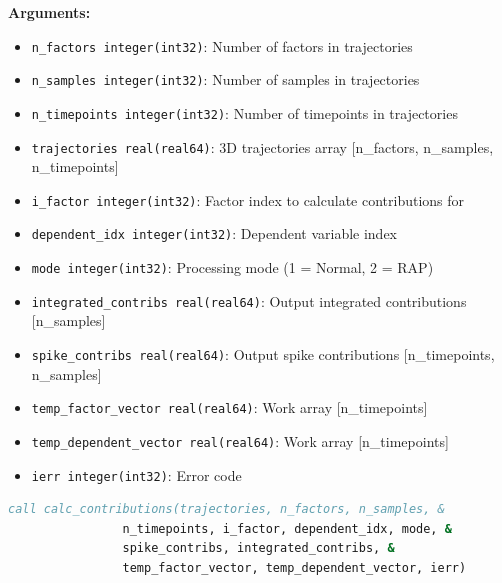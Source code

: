 \documentclass[11pt]{article}
\begin{document}
\begin{enumerate}
\begin{enumerate}
	      	      \textbf{Arguments:}
	      	      \begin{itemize}
	      	      	\item \texttt{n\_factors integer(int32)}: Number of factors in trajectories
	      	      	      
	      	      	\item \texttt{n\_samples integer(int32)}: Number of samples in trajectories
	      	      	      
	      	      	\item \texttt{n\_timepoints integer(int32)}: Number of timepoints in
	      	      	      trajectories
	      	      	      
	      	      	\item \texttt{trajectories real(real64)}: 3D trajectories array [n\_factors,
	      	      	n\_samples, n\_timepoints]
	      	      	
	      	      	\item \texttt{i\_factor integer(int32)}: Factor index to calculate contributions
	      	      	      for
	      	      	      
	      	      	\item \texttt{dependent\_idx integer(int32)}: Dependent variable index
	      	      	      
	      	      	\item \texttt{mode integer(int32)}: Processing mode (1 = Normal, 2 =
	      	      	      RAP)
	      	      	      
	      	      	\item \texttt{integrated\_contribs real(real64)}: Output integrated contributions
	      	      	      [n\_samples]
	      	      	      
	      	      	\item \texttt{spike\_contribs real(real64)}: Output spike contributions
	      	      	      [n\_timepoints, n\_samples]
	      	      	      
	      	      	\item \texttt{temp\_factor\_vector real(real64)}: Work array [n\_timepoints]
	      	      	      
	      	      	\item \texttt{temp\_dependent\_vector real(real64)}: Work array [n\_timepoints]
	      	      	      
	      	      	\item \texttt{ierr integer(int32)}: Error code
	      	      \end{itemize}
	      	      \begin{lstlisting}[language=Fortran, caption={Expert Contributions Calculation}]
call calc_contributions(trajectories, n_factors, n_samples, & 
                n_timepoints, i_factor, dependent_idx, mode, &
                spike_contribs, integrated_contribs, &
                temp_factor_vector, temp_dependent_vector, ierr)
	      	      \end{lstlisting}
	      	      

\end{enumerate}
\end{enumerate}
\end{document}
